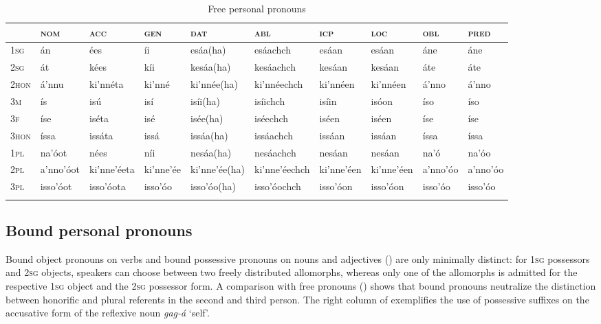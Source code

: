 \documentclass[output=paper]{langscibook}
\begin{document}
\begin{sidewaystable}
\caption{Free personal pronouns}
\label{tab:treis:1}
\begin{tabularx}{\textwidth}{lXp{1.7cm}Xp{2cm}p{2cm}XXXX} 
\lsptoprule
& {\textsc{nom}} & {\textsc{acc}} & {\textsc{gen}} & {\textsc{dat}} & {\textsc{abl}} & {\textsc{icp}} & {\textsc{loc}} & {\textsc{obl}} & {\textsc{pred}}\\
\midrule
\textsc{1sg} & {án} & {ées} & {íi} & {esáa(ha)} & {esáachch} & {esáan} & {esáan} & {áne} & {áne}\\
\textsc{2sg} & {át} & {kées} & {kíi} & {kesáa(ha)} & {kesáachch} & {kesáan} & {kesáan} & {áte} & {áte}\\
\textsc{2hon} & {á’nnu} & {ki’nnéta} & {ki’nné} & {ki’nnée(ha)} & {ki’nnéechch} & {ki’nnéen} & {ki’nnéen} & {á’nno} & {á’nno}\\
\textsc{3m} & {ís} & {isú} & {isí} & {isíi(ha)} & {isíichch} & {isíin} & {isóon} & {íso} & {íso}\\
\textsc{3f} & {íse} & {iséta} & {isé} & {isée(ha)} & {iséechch} & {iséen} & {iséen} & {íse} & {íse}\\
\textsc{3hon} & {íssa} & {issáta} & {issá} & {issáa(ha)} & {issáachch} & {issáan} & {issáan} & {íssa} & {íssa}\\
\textsc{1pl} & {na’óot} & {nées} & {níi} & {nesáa(ha)} & {nesáachch} & {nesáan} & {nesáan} & {na’ó} & {na’óo}\\
\textsc{2pl} & {a’nno’óot} & {ki’nne’éeta} & {ki’nne’ée} & {ki’nne’ée(ha)} & {ki’nne’éechch} & {ki’nne’éen} & {ki’nne’éen} & {a’nno’óo} & {a’nno’óo}\\
\textsc{3pl} & {isso’óot} & {isso’óota} & {isso’óo} & {isso’óo(ha)} & {isso’óochch} & {isso’óon} & {isso’óon} & {isso’óo} & {isso’óo}\\
\lspbottomrule
\end{tabularx}
\end{sidewaystable}

\subsection{Bound personal pronouns}\label{sec:treis:2.2}

Bound object pronouns on verbs and bound possessive pronouns on nouns and adjectives () are only minimally distinct: for \textsc{1sg} possessors and \textsc{2sg} objects, speakers can choose between two freely distributed allomorphs, whereas only one of the allomorphs is admitted for the respective \textsc{1sg} object and the \textsc{2sg} possessor form. A comparison with free pronouns () shows that bound pronouns neutralize the distinction between honorific and plural referents in the second and third person. The right column of  exemplifies the use of possessive suffixes on the accusative form of the reflexive noun \textit{gag-á} ‘self’.
\end{document}
